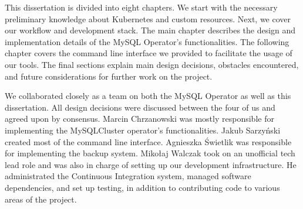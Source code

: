 This dissertation is divided into eight chapters. We start with the necessary 
preliminary knowledge about Kubernetes and custom resources. Next, we cover 
our workflow and development stack. The main chapter describes the design and 
implementation details of the MySQL Operator's functionalities. The following 
chapter covers the command line interface we  provided to facilitate the usage
of our tools. The final sections explain main  design decisions, obstacles encountered,
and future considerations for further work on the project.

We collaborated closely as a team on both the MySQL Operator as well as this
dissertation. All design decisions were discussed between the four of us and
agreed upon by consensus. Marcin Chrzanowski was mostly responsible for
implementing the MySQLCluster operator's functionalities. Jakub Sarzyński
created most of the command line interface. Agnieszka Świetlik was responsible
for implementing the backup system. Mikołaj Walczak took on an unofficial tech
lead role and was also in charge of setting up our development infrastructure.
He administrated the Continuous Integration system, managed software
dependencies, and set up testing, in addition to contributing code to various
areas of the project.

